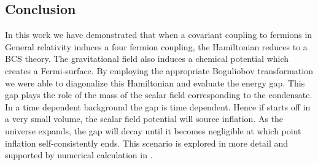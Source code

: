\begin{doublespace}

\section{Conclusion}

In this work we have demonstrated that when a covariant coupling to fermions in General relativity
induces a four fermion coupling, the Hamiltonian reduces to a BCS theory.  The gravitational field
also induces a chemical potential which creates a Fermi-surface.  By employing the appropriate
Boguliobov transformation we were able to diagonalize this Hamiltonian and evaluate the energy gap.
This gap plays the role of the mass of the scalar field corresponding to the condensate. In a time
dependent background the gap is time dependent. Hence if starts off in a very small volume, the
scalar field potential will source inflation. As the universe expands, the gap will decay until it
becomes negligible at which point inflation self-consistently ends. This scenario is explored in
more detail and supported by numerical calculation in \cite{Alexander2007Fine}.


\end{doublespace}
